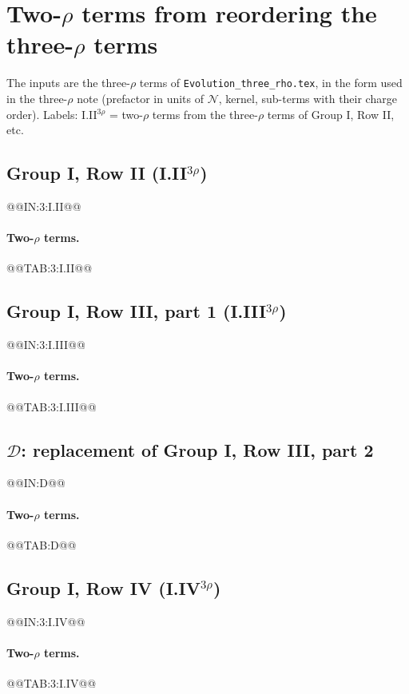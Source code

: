 \documentclass[10pt]{article}
\numberwithin{equation}{section}
\newcommand{\NN}{\mathcal N}
\begin{document}
\section{Two-\texorpdfstring{$\rho$}{rho} terms from reordering the three-\texorpdfstring{$\rho$}{rho} terms}\label{sec:three}
The inputs are the three-$\rho$ terms of \texttt{Evolution\_three\_rho.tex}, in the form used in the three-$\rho$ note (prefactor in units of $\NN$, kernel, sub-terms with their charge order). Labels: I.II$^{3\rho}$ = two-$\rho$ terms from the three-$\rho$ terms of Group I, Row II, etc.

\subsection{Group I, Row II \texorpdfstring{(I.II$^{3\rho}$)}{}}\label{src:3:I.II}
@@IN:3:I.II@@
\paragraph{Two-$\rho$ terms.}
@@TAB:3:I.II@@

\subsection{Group I, Row III, part 1 \texorpdfstring{(I.III$^{3\rho}$)}{}}\label{src:3:I.III}
@@IN:3:I.III@@
\paragraph{Two-$\rho$ terms.}
@@TAB:3:I.III@@

\subsection{\texorpdfstring{$\mathcal D$}{D}: replacement of Group I, Row III, part 2}\label{src:D}
@@IN:D@@
\paragraph{Two-$\rho$ terms.}
@@TAB:D@@

\subsection{Group I, Row IV \texorpdfstring{(I.IV$^{3\rho}$)}{}}\label{src:3:I.IV}
@@IN:3:I.IV@@
\paragraph{Two-$\rho$ terms.}
@@TAB:3:I.IV@@
\end{document}
